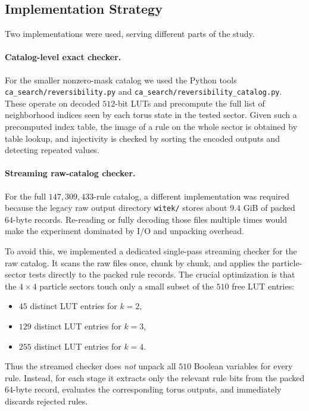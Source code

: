 \documentclass[11pt,a4paper]{article}
\begin{document}
\subsection{Implementation Strategy}

Two implementations were used, serving different parts of the study.

\paragraph{Catalog-level exact checker.}
For the smaller nonzero-mask catalog we used the Python tools
\texttt{ca\_search/reversibility.py} and
\texttt{ca\_search/reversibility\_catalog.py}.  These operate on decoded \(512\)-bit LUTs and
precompute the full list of neighborhood indices seen by each torus state in the tested sector.
Given such a precomputed index table, the image of a rule on the whole sector is obtained by
table lookup, and injectivity is checked by sorting the encoded outputs and detecting repeated
values.

\paragraph{Streaming raw-catalog checker.}
For the full \(147{,}309{,}433\)-rule catalog, a different implementation was required because
the legacy raw output directory \texttt{witek/} stores about \(9.4\) GiB of packed \(64\)-byte
records.  Re-reading or fully decoding those files multiple times would make the experiment
dominated by I/O and unpacking overhead.

To avoid this, we implemented a dedicated single-pass streaming checker for the raw catalog.  It scans the raw files once, chunk by
chunk, and applies the particle-sector tests directly to the packed rule records.  The crucial
optimization is that the \(4\times4\) particle sectors touch only a small subset of the \(510\)
free LUT entries:
\begin{itemize}
\item \(45\) distinct LUT entries for \(k=2\),
\item \(129\) distinct LUT entries for \(k=3\),
\item \(255\) distinct LUT entries for \(k=4\).
\end{itemize}
Thus the streamed checker does \emph{not} unpack all \(510\) Boolean variables for every rule.
Instead, for each stage it extracts only the relevant rule bits from the packed \(64\)-byte
record, evaluates the corresponding torus outputs, and immediately discards rejected rules.
\end{document}
